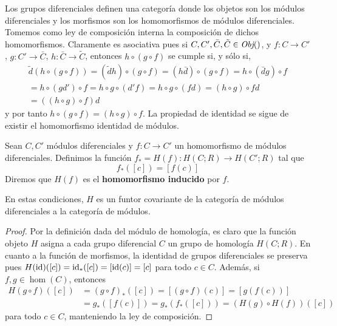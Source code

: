 Los grupos diferenciales definen una categoría donde los objetos son los módulos
diferenciales y los morfismos son los homomorfismos de módulos diferenciales. Tomemos
como ley de composición interna la composición de dichos homomorfismos.
Claramente es asociativa pues si \(C, C', \bar{C}, \tilde{C}\in \operatorname{\textit{Obj}}()\), y \(f\colon
C \to C'\), \(g \colon C' \to \bar{C}\), \(h\colon \bar{C}\to \tilde{C}\), entonces
\(h \circ (g \circ f)\) se cumple si, y sólo si,
\begin{gather*}
	\tilde{d}(h \circ (g \circ f)) = (\tilde{d}h) \circ (g \circ f) = (h\bar{d}) \circ
	(g \circ f) = h \circ (\bar{d}g) \circ f \\ = h \circ (g d') \circ f = h \circ
	g \circ (d'f) = h \circ g \circ (fd) = (h \circ g) \circ fd \\ = ((h \circ g) \circ
	f) d
\end{gather*}
y por tanto \(h \circ (g \circ f) = (h \circ g) \circ f\). La propiedad de identidad
se sigue de existir el homomorfismo identidad de módulos.

\begin{definicion}
	Sean \(C, C'\) módulos diferenciales y \(f:C \rightarrow C'\) un homomorfismo de módulos
	diferenciales. Definimos la función \(f_{*}= H(f): H(C;R) \rightarrow H(C';R)\)
	tal que
	\[
	f_{*}([c]) = [f(c)]
	\]
	Diremos que \(H(f)\) es el \textbf{homomorfismo inducido} por \(f\).
\end{definicion}
\begin{proposicion}
	En estas condiciones, \(H\) es un funtor covariante de la categoría de módulos
	diferenciales a la categoría de módulos.
\end{proposicion}
\begin{proof}
	Por la definición dada del módulo de homología, es claro que la función objeto
	\(H\) asigna a cada grupo diferencial \(C\) un grupo de homología \(H(C;R)\). En cuanto
	a la función de morfismos, la identidad de grupos diferenciales se preserva
	pues \(H(\operatorname{id})([c]) = \operatorname{id}_{*}([c]) = [\operatorname{id}(c)] = [c]\) para todo \(c \in C\). Además,
	si \(f,g \in \hom(C)\), entonces
	\begin{align*}
		H(g \circ f)([c]) & = (g \circ f)_{*}([c]) = [(g \circ f)(c)] = [g (f (c))]         \\
		& = g_{*}([f(c)]) = g_{*} ( f_{*}([c])) = (H(g) \circ H(f)) ([c])
	\end{align*}
	para todo \(c \in C\), manteniendo la ley de composición.
\end{proof}


